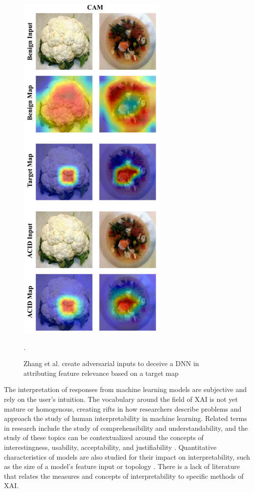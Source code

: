 \begin{figure}
    \centering
    \includegraphics[height=7in]{media/zhang2018.png}
    \caption{Zhang et al. create adversarial inputs to deceive a DNN in attributing feature relevance based on a target map \cite{DBLP:journals/corr/abs-1812-00891}}.
    \label{fig:zhang2018}
\end{figure}

The interpretation of responses from machine learning models are subjective and rely on the user's intuition.  The vocabulary around the field of XAI is not yet mature or homogenous, creating rifts in how researchers describe problems and approach the study of human interpretability in machine learning.  Related terms in research include the study of comprehensibility and understandability, and the study of these topics can be contextualized around the concepts of interestingness, usability, acceptability, and justifiability \cite{Bibal2016}.  Quantitative characteristics of models are also studied for their impact on interpretability, such as the size of a model's feature input or topology \cite{Bibal2016}.  There is a lack of literature that relates the measures and concepts of interpretability to specific methods of XAI.

